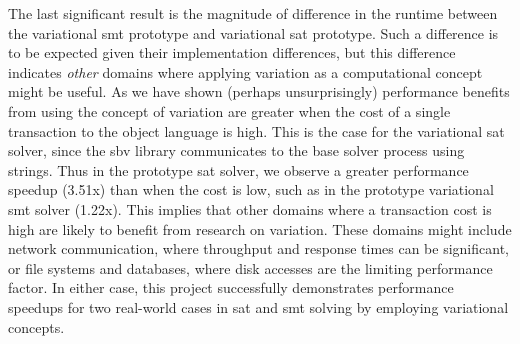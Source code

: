 The last significant result is the magnitude of difference in the runtime
between the variational \ac{smt} prototype and variational \ac{sat} prototype.
Such a difference is to be expected given their implementation differences, but
this difference indicates \emph{other} domains where applying variation as a
computational concept might be useful. As we have shown (perhaps unsurprisingly)
performance benefits from using the concept of variation are greater when the
cost of a single transaction to the object language is high. This is the case
for the variational \ac{sat} solver, since the sbv library communicates to the
base solver process using strings. Thus in the prototype \ac{sat} solver, we
observe a greater performance speedup (3.51x) than when the cost is low, such as
in the prototype variational \ac{smt} solver (1.22x). This implies that other
domains where a transaction cost is high are likely to benefit from research on
variation. These domains might include network communication, where throughput
and response times can be significant, or file systems and databases, where disk
accesses are the limiting performance factor. In either case, this project
successfully demonstrates performance speedups for two real-world cases in
\ac{sat} and \ac{smt} solving by employing variational concepts.
